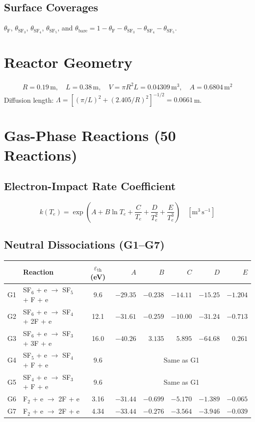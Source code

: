 \documentclass[11pt,a4paper]{article}
\begin{document}
\subsection{Surface Coverages}
$\theta_\text{F}$, $\theta_{\text{SF}_3}$, $\theta_{\text{SF}_4}$, $\theta_{\text{SF}_5}$, and $\theta_\text{bare} = 1 - \theta_\text{F} - \theta_{\text{SF}_3} - \theta_{\text{SF}_4} - \theta_{\text{SF}_5}$.

\section{Reactor Geometry}

\begin{align}
R = 0.19\,\text{m},\quad L = 0.38\,\text{m},\quad V = \pi R^2 L = 0.04309\,\text{m}^3,\quad A = 0.6804\,\text{m}^2
\end{align}
Diffusion length: $\Lambda = [({\pi}/{L})^2 + ({2.405}/{R})^2]^{-1/2} = 0.0661\,$m.

\section{Gas-Phase Reactions (50 Reactions)}

\subsection{Electron-Impact Rate Coefficient}
\begin{equation}\label{eq:krate}
\boxed{k(T_e) = \exp\!\left(A + B\ln T_e + \frac{C}{T_e} + \frac{D}{T_e^2} + \frac{E}{T_e^3}\right) \quad [\text{m}^3\,\text{s}^{-1}]}
\end{equation}

\subsection{Neutral Dissociations (G1--G7)}

\begin{longtable}{clcrrrrr}
\toprule
& \textbf{Reaction} & $\varepsilon_\text{th}$ (eV) & $A$ & $B$ & $C$ & $D$ & $E$ \\
\midrule
G1 & SF$_6$ + e $\to$ SF$_5$ + F + e & 9.6 & $-29.35$ & $-0.238$ & $-14.11$ & $-15.25$ & $-1.204$ \\
G2 & SF$_6$ + e $\to$ SF$_4$ + 2F + e & 12.1 & $-31.61$ & $-0.259$ & $-10.00$ & $-31.24$ & $-0.713$ \\
G3 & SF$_6$ + e $\to$ SF$_3$ + 3F + e & 16.0 & $-40.26$ & $3.135$ & $5.895$ & $-64.68$ & $0.261$ \\
G4 & SF$_5$ + e $\to$ SF$_4$ + F + e & 9.6 & \multicolumn{5}{c}{Same as G1} \\
G5 & SF$_4$ + e $\to$ SF$_3$ + F + e & 9.6 & \multicolumn{5}{c}{Same as G1} \\
G6 & F$_2$ + e $\to$ 2F + e & 3.16 & $-31.44$ & $-0.699$ & $-5.170$ & $-1.389$ & $-0.065$ \\
G7 & F$_2$ + e $\to$ 2F + e & 4.34 & $-33.44$ & $-0.276$ & $-3.564$ & $-3.946$ & $-0.039$ \\
\bottomrule
\end{longtable}
\end{document}
